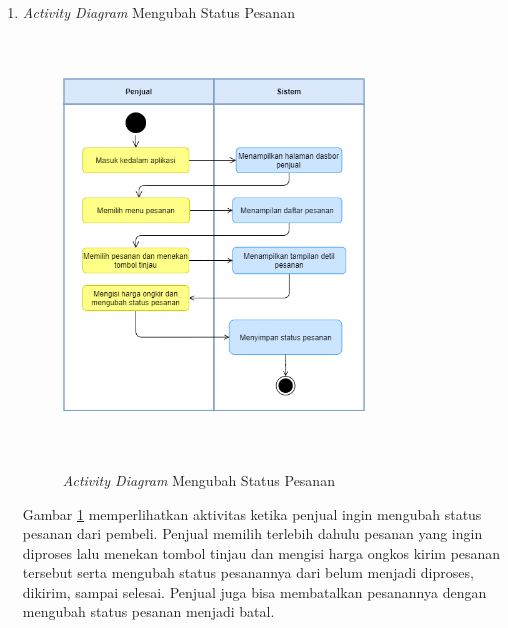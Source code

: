 \begin{enumerate}
	\item \textit{Activity Diagram} Mengubah Status Pesanan
	\begin{figure}[H]
		\centering
		{\includegraphics [width = 8cm, height= 11cm]{gambar/activity diagram/ubah status pesanan}}
		\caption{\textit{Activity Diagram} Mengubah Status Pesanan}
		\label{ubah status pesanan}
	\end{figure}
	\par Gambar \ref*{ubah status pesanan} memperlihatkan aktivitas ketika penjual ingin mengubah status pesanan dari pembeli. Penjual memilih terlebih dahulu pesanan yang ingin diproses lalu menekan tombol tinjau dan mengisi harga ongkos kirim pesanan tersebut serta mengubah status pesanannya dari belum menjadi diproses, dikirim, sampai selesai. Penjual juga bisa membatalkan pesanannya dengan mengubah status pesanan menjadi batal.


\end{enumerate}
